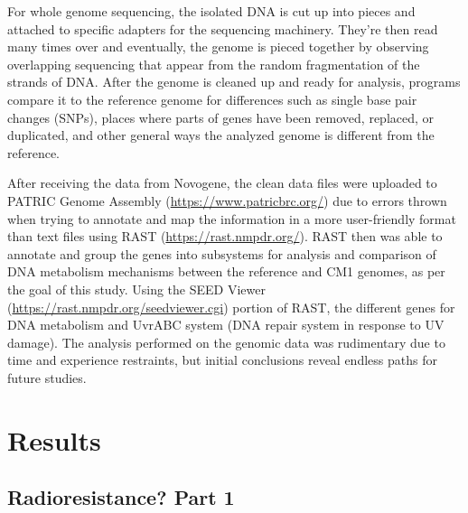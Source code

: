 \documentclass[12pt,twoside]{reedthesis}
\begin{document}
For whole genome sequencing, the isolated DNA is cut up into pieces and attached to specific adapters for the sequencing machinery. They're then read many times over and eventually, the genome is pieced together by observing overlapping sequencing that appear from the random fragmentation of the strands of DNA. After the genome is cleaned up and ready for analysis, programs compare it to the reference genome for differences such as single base pair changes (SNPs), places where parts of genes have been removed, replaced, or duplicated, and other general ways the analyzed genome is different from the reference.

After receiving the data from Novogene, the clean data files were uploaded to PATRIC Genome Assembly (\url{https://www.patricbrc.org/}) due to errors thrown when trying to annotate and map the information in a more user-friendly format than text files using RAST (\url{https://rast.nmpdr.org/}). RAST then was able to annotate and group the genes into subsystems for analysis and comparison of DNA metabolism mechanisms between the reference and CM1 genomes, as per the goal of this study. Using the SEED Viewer (\url{https://rast.nmpdr.org/seedviewer.cgi}) portion of RAST, the different genes for DNA metabolism and UvrABC system (DNA repair system in response to UV damage). The analysis performed on the genomic data was rudimentary due to time and experience restraints, but initial conclusions reveal endless paths for future studies.

\hypertarget{results}{%
\chapter{Results}\label{results}}

\hypertarget{radioresistance-part-1}{%
\section{Radioresistance? Part 1}\label{radioresistance-part-1}}
\end{document}
